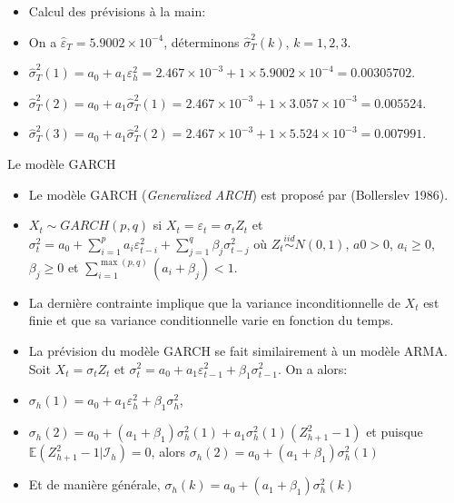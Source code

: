 \documentclass[
  ignorenonframetext,
]{beamer}
\begin{document}
\begin{frame}
\begin{itemize}[<+->]
\item
  Calcul des prévisions à la main:
\item
  On a \(\widehat{\varepsilon}_T=5.9002 \times 10^{-4}\), déterminons
  \(\widehat{\sigma}^2_T(k)\), \(k=1,2,3\).
\item
  \(\widehat{\sigma}^2_T(1)=a_0+a_1 \varepsilon^2_h=2.467 \times 10^{-3}+1\times 5.9002 \times 10^{-4}=0.00305702\).
\item
  \(\widehat{\sigma}^2_T(2)=a_0+a_1 \widehat{\sigma}^2_T(1)=2.467 \times 10^{-3}+1\times 3.057 \times 10^{-3}=0.005524\).
\item
  \(\widehat{\sigma}^2_T(3)=a_0+a_1 \widehat{\sigma}^2_T(2)=2.467 \times 10^{-3}+1\times 5.524 \times 10^{-3}=0.007991\).
\end{itemize}
\end{frame}

\begin{frame}{Le modèle GARCH}
\protect\hypertarget{le-moduxe8le-garch}{}
\begin{itemize}[<+->]
\item
  Le modèle GARCH (\emph{Generalized ARCH}) est proposé par (Bollerslev
  1986).
\item
  \(X_t\sim GARCH(p,q)\) si \(X_t=\varepsilon_t=\sigma_tZ_t\) et
  \(\sigma^2_t=a_0+\displaystyle \sum_{i=1}^pa_i\varepsilon^2_{t-i}+\displaystyle \sum_{j=1}^q\beta_j\sigma^2_{t-j}\)
  où \(Z_t \stackrel{iid}{\sim}N(0,1)\), \(a0 >0\), \(a_i \geq 0\),
  \(\beta_j \geq 0\) et
  \(\displaystyle \sum_{i=1}^{\max(p,q)}(a_i+\beta_j) < 1\).
\item
  La dernière contrainte implique que la variance inconditionnelle de
  \(X_t\) est finie et que sa variance conditionnelle varie en fonction
  du temps.
\item
  La prévision du modèle GARCH se fait similairement à un modèle ARMA.
  Soit \(X_t=\sigma_t Z_t\) et
  \(\sigma^2_t=a_0+a_1 \varepsilon^2_{t-1}+\beta_1\sigma^2_{t-1}\). On a
  alors:
\item
  \(\sigma_h(1)=a_0+a_1\varepsilon^2_h+\beta_1\sigma^2_h\),
\item
  \(\sigma_h(2)=a_0+(a_1+\beta_1)\sigma^2_h(1)+a_1\sigma^2_h(1)(Z^2_{h+1}-1)\)
  et puisque \(\mathbb{E}(Z^2_{h+1}-1|\mathcal{I}_h)=0\), alors
  \(\sigma_h(2)=a_0+(a_1+\beta_1)\sigma^2_h(1)\)
\item
  Et de manière générale, \(\sigma_h(k)=a_0+(a_1+\beta_1)\sigma^2_h(k)\)
\end{itemize}
\end{frame}
\end{document}
